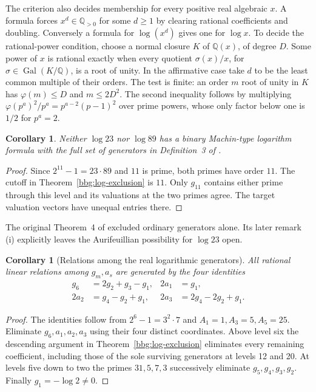 \documentclass[11pt]{article}
\newtheorem{corollary}[theorem]{Corollary}
\begin{document}
The criterion also decides membership for every positive real algebraic $x$.
A formula forces $x^d\in\mathbb Q_{>0}$ for some $d\ge1$ by clearing rational coefficients and doubling. Conversely a formula for $\log(x^d)$ gives one for $\log x$. To decide the rational-power condition, choose a normal closure $K$ of $\mathbb Q(x)$, of degree $D$. Some power of $x$ is rational exactly when every quotient $\sigma(x)/x$, for $\sigma\in\operatorname{Gal}(K/\mathbb Q)$, is a root of unity. In the affirmative case take $d$ to be the least common multiple of their orders. The test is finite: an order $m$ root of unity in $K$ has $\varphi(m)\le D$ and $m\le2D^2$. The second inequality follows by multiplying $\varphi(p^a)^2/p^a=p^{a-2}(p-1)^2$ over prime powers, whose only factor below one is $1/2$ for $p^a=2$.

\begin{corollary}\label{bbp:log23}
Neither $\log 23$ nor $\log 89$ has a binary Machin-type logarithm formula with the full set of generators in Definition~3 of \cite{BBG}.
\end{corollary}
\begin{proof}
Since $2^{11}-1=23\cdot89$ and $11$ is prime, both primes have order $11$. The cutoff in Theorem~\ref{bbg:log-exclusion} is $11$. Only $g_{11}$ contains either prime through this level and its valuations at the two primes agree. The target valuation vectors have unequal entries there.
\end{proof}
The original Theorem~4 of \cite{BBG} excluded ordinary generators alone. Its later remark (i) explicitly leaves the Aurifeuillian possibility for $\log 23$ open.

\begin{corollary}[Relations among the real logarithmic generators]
All rational linear relations among $g_m,a_s$ are generated by the four identities
\begin{align*}
 g_6&=2g_2+g_3-g_1,&2a_1&=g_1,\\
 2a_2&=g_4-g_2+g_1,&2a_3&=2g_4-2g_2+g_1.
\end{align*}
\end{corollary}
\begin{proof}
The identities follow from $2^6-1=3^2\cdot7$ and $A_1=1,A_3=5,A_5=25$. Eliminate $g_6,a_1,a_2,a_3$ using their four distinct coordinates. Above level six the descending argument in Theorem~\ref{bbg:log-exclusion} eliminates every remaining coefficient, including those of the sole surviving generators at levels 12 and 20. At levels five down to two the primes $31,5,7,3$ successively eliminate $g_5,g_4,g_3,g_2$. Finally $g_1=-\log 2\ne0$. 
\end{proof}
\end{document}
